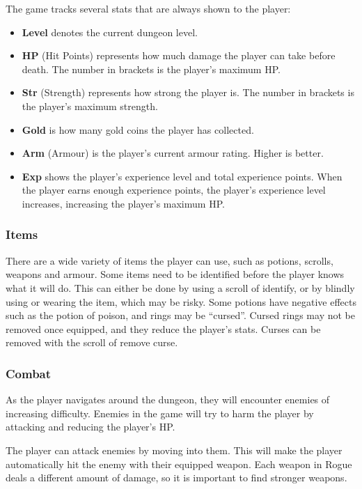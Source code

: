 \documentclass[12pt,a4paper]{article}
\begin{document}
    The game tracks several stats that are always shown to the player:
    \begin{itemize}
        \item \textbf{Level} denotes the current dungeon level.
        \item \textbf{HP} (Hit Points) represents how much damage the player can take before death.
            The number in brackets is the player's maximum HP.
        \item \textbf{Str} (Strength) represents how strong the player is.
            The number in brackets is the player's maximum strength.
        \item \textbf{Gold} is how many gold coins the player has collected.
        \item \textbf{Arm} (Armour) is the player's current armour rating.
            Higher is better.
        \item \textbf{Exp} shows the player's experience level and total experience points.
            When the player earns enough experience points, the player's experience level increases, increasing the player's maximum HP.
    \end{itemize}

    \subsubsection{Items}\label{subsubsec:items}

    There are a wide variety of items the player can use, such as potions, scrolls, weapons and armour.
    Some items need to be identified before the player knows what it will do.
    This can either be done by using a scroll of identify, or by blindly using or wearing the item, which may be risky.
    Some potions have negative effects such as the potion of poison, and rings may be ``cursed''.
    Cursed rings may not be removed once equipped, and they reduce the player's stats.
    Curses can be removed with the scroll of remove curse.

    \subsubsection{Combat}\label{subsubsec:combat}
    As the player navigates around the dungeon, they will encounter enemies of increasing difficulty.
    Enemies in the game will try to harm the player by attacking and reducing the player's HP\@.

    The player can attack enemies by moving into them.
    This will make the player automatically hit the enemy with their equipped weapon.
    Each weapon in Rogue deals a different amount of damage, so it is important to find stronger weapons.
\end{document}
